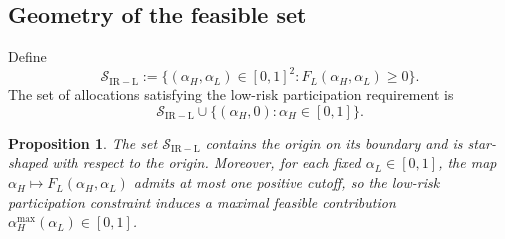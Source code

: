 \documentclass[a4paper,12pt]{article}
\newtheorem{proposition}[theorem]{Proposition}
\theoremstyle{definition}
\theoremstyle{remark}
\newcommand{\1}{\mathbf{1}}
\begin{document}
\subsection{Geometry of the feasible set}

Define
\[
\mathcal S_{\mathrm{IR-L}}
:=
\bigl\{(\alpha_H,\alpha_L)\in[0,1]^2: F_L(\alpha_H,\alpha_L)\ge 0\bigr\}.
\]
The set of allocations satisfying the low-risk participation requirement is
\[
\mathcal S_{\mathrm{IR-L}}
\cup
\bigl\{(\alpha_H,0):\alpha_H\in[0,1]\bigr\}.
\]

\begin{proposition}\label{prop:IRL-properties-new}
The set \(\mathcal S_{\mathrm{IR-L}}\) contains the origin on its boundary and is
star-shaped with respect to the origin. Moreover, for each fixed
\(\alpha_L\in[0,1]\), the map \(\alpha_H\mapsto F_L(\alpha_H,\alpha_L)\) admits
at most one positive cutoff, so the low-risk participation constraint induces a
maximal feasible contribution \(\alpha_H^{\max}(\alpha_L)\in[0,1]\).
\end{proposition}
\end{document}
